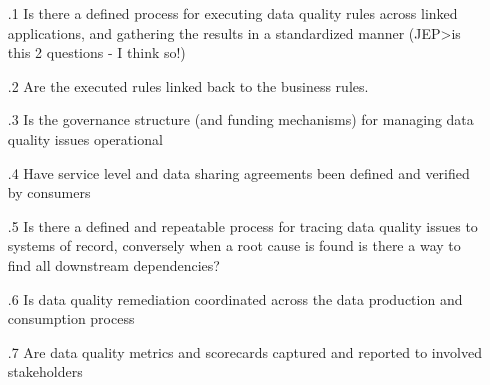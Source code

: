 \begin{itemize}[leftmargin=.5in]

  \item [\thesection.1] Is there a defined process for executing data quality rules across linked applications, and gathering the results in a standardized manner (JEP>is this 2 questions - I think so!)
  \item [\thesection.2] Are the executed rules linked back to the business rules.
  \item [\thesection.3] Is the governance structure (and funding mechanisms) for managing data quality issues operational
  \item [\thesection.4] Have service level and data sharing agreements been defined and verified by consumers
  \item [\thesection.5] Is there a defined and repeatable process for tracing data quality issues to systems of record, conversely when a root cause is found is there a way to find all downstream dependencies?
  \item [\thesection.6] Is data quality remediation coordinated across the data production and consumption process
  \item [\thesection.7] Are data quality metrics and scorecards captured and reported to involved stakeholders

\end{itemize}

